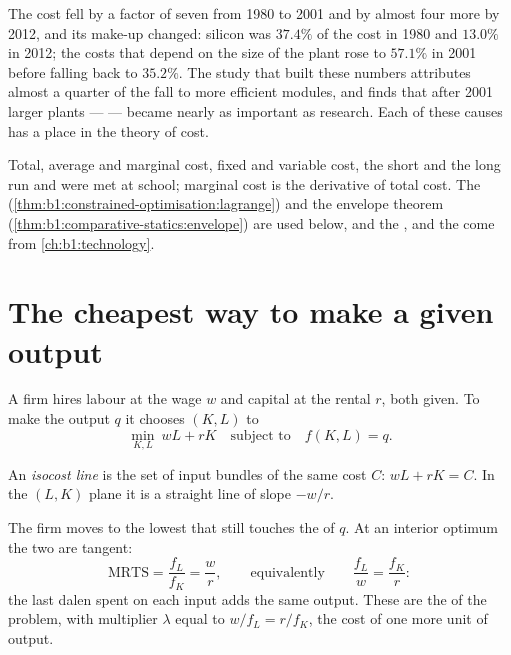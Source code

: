 The cost fell by a factor of seven from 1980 to 2001 and by almost four
more by 2012, and its make-up changed: silicon was $37.4\%$ of the cost in
1980 and $13.0\%$ in 2012; the costs that depend on the size of the plant
rose to $57.1\%$ in 2001 before falling back to $35.2\%$. %
The study that built these numbers attributes almost a quarter of the fall
to more efficient modules, and finds that after 2001 larger plants ---
 --- became nearly as important as research. %
Each of these causes has a place in the theory of cost.

\begin{recall}
Total, average and marginal cost, fixed and variable cost, the short and the
long run and  were met at school; marginal cost is the
derivative of total cost. The 
(\cref{thm:b1:constrained-optimisation:lagrange}) and the envelope theorem
(\cref{thm:b1:comparative-statics:envelope}) are used below, and the
,  and the  come from
\cref{ch:b1:technology}.
\end{recall}

\section{The cheapest way to make a given output}\label{sec:b1:cost-minimisation:isocost}

A firm hires labour at the wage $w$ and capital at the rental $r$, both
given. To make the output $q$ it chooses $(K, L)$ to
\[
\min_{K, L}\ wL + rK \quad\text{subject to}\quad f(K, L) = q.
\]

\begin{definition}\label{def:b1:cost-minimisation:isocost}
An \emph{isocost line} is the set of input bundles of the same cost $C$:
$wL + rK = C$. In the $(L, K)$ plane it is a straight line of slope $-w/r$.
\end{definition}

The firm moves to the lowest  that still touches the 
of $q$. At an interior optimum the two are tangent:
\[
\mathrm{MRTS} = \frac{f_L}{f_K} = \frac{w}{r}, \qquad\text{equivalently}\qquad \frac{f_L}{w} = \frac{f_K}{r}:
\]
the last dalen spent on each input adds the same output. These are the
 of the problem, with multiplier $\lambda$ equal to
$w/f_L = r/f_K$, the cost of one more unit of output.

